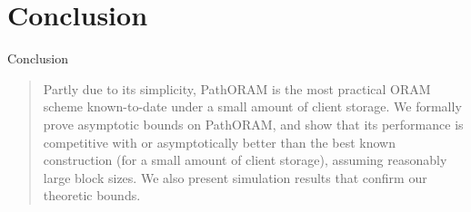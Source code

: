 
\section{Conclusion}

	\begin{frame}{Conclusion}

		\begin{quote}

			Partly due to its simplicity, PathORAM is the most practical ORAM scheme known-to-date under a small amount of client storage.
			We formally prove asymptotic bounds on PathORAM, and show that its performance is competitive with or asymptotically better than the best known construction (for a small amount of client storage), assuming reasonably large block sizes. 
			We also present simulation results that confirm our theoretic bounds.~\cite{DBLP:journals/corr/abs-1202-5150}

		\end{quote}


	\end{frame}
